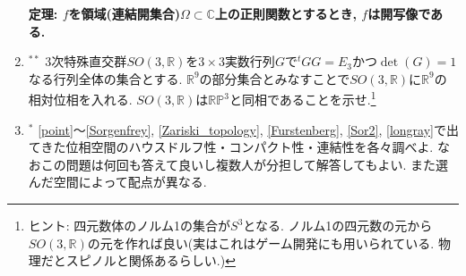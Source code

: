 \documentclass[dvipdfmx,a4paper,11pt]{article}
\newcommand{\R}{\mathbb{R}}
\newcommand{\C}{\mathbb{C}}
\theoremstyle{definition}
\begin{document}
\begin{enumerate}[label=\textbf{問}\ref*{sec-compact_continue}.\arabic*]
   \begin{tcolorbox}[
    colback = white,
    colframe = green!35!black,
    fonttitle = \bfseries,
    breakable = true]
 \bf{ 定理:}  $f$を領域(連結開集合)$\Omega \subset \C$上の正則関数とするとき, $f$は開写像である.
 \end{tcolorbox}



\item \label{so3} $^{**}$ 3次特殊直交群$SO(3,\R)$を$ 3\times 3$実数行列$G$で$^{t}GG=E_3$かつ$\det(G)=1$なる行列全体の集合とする. $\R^{9}$の部分集合とみなすことで$SO(3,\R)$に$\R^{9}$の相対位相を入れる. 
$SO(3,\R)$は$\R\mathbb{P}^{3}$と同相であることを示せ.\footnote{ヒント: 四元数体のノルム1の集合が$S^3$となる. ノルム1の四元数の元から$SO(3,\R)$の元を作れば良い(実はこれはゲーム開発にも用いられている. 物理だとスピノルと関係あるらしい.)}




\item $^{*}$ \ref{point}〜\ref{Sorgenfrey}, \ref{Zariski_topology}, \ref{Furstenberg}, \ref{Sor2}, \ref{longray}で出てきた位相空間のハウスドルフ性・コンパクト性・連結性を各々調べよ.
なおこの問題は何回も答えて良いし複数人が分担して解答してもよい. また選んだ空間によって配点が異なる. 

\end{enumerate}
\end{document}
